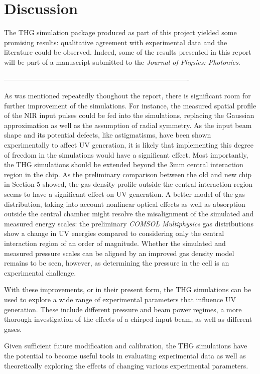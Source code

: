 \documentclass[a4paper]{jpconf}
\begin{document}
\section{Discussion}
The THG simulation package produced as part of this project yielded some promising results: qualitative agreement with experimental data and the literature could be observed. Indeed, some of the results presented in this report will be part of a manuscript submitted to the \textit{Journal of Physics: Photonics}. \par 
-------------------------------------------------------------------------------

As was mentioned repeatedly thoughout the report, there is significant room for further improvement of the simulations. For instance, the measured spatial profile of the NIR input pulses could be fed into the simulations, replacing the Gaussian approximation as well as the assumption of radial symmetry. As the input beam shape and its potential defects, like astigmatisms, have been shown experimentally to affect UV generation, it is likely that implementing this degree of freedom in the simulations would have a significant effect. Most importantly, the THG simulations should be extended beyond the 3mm central interaction region in the chip. As the preliminary comparison between the old and new chip in Section 5 showed, the gas density profile outside the central interaction region seems to have a significant effect on UV generation.  A better model of the gas distribution, taking into account nonlinear optical effects as well as absorption outside the central chamber might resolve the misalignment of the simulated and measured energy scales: the preliminary \textit{COMSOL Multiphysics} gas distributions show a change in UV energies compared to considering only the central interaction region of an order of magnitude. Whether the simulated and measured pressure scales can be aligned by an improved gas density model remains to be seen, however, as determining the pressure in the cell is an experimental challenge. \par 
With these improvements, or in their present form, the THG simulations can be used to explore a wide range of experimental parameters that influence UV generation. These include different pressure and beam power regimes, a more thorough investigation of the effects of a chirped input beam, as well as different gases. \par 
Given sufficient future modification and calibration, the THG simulations have the potential to become useful tools in evaluating experimental data as well as theoretically exploring the effects of changing various experimental parameters.  
\end{document}
